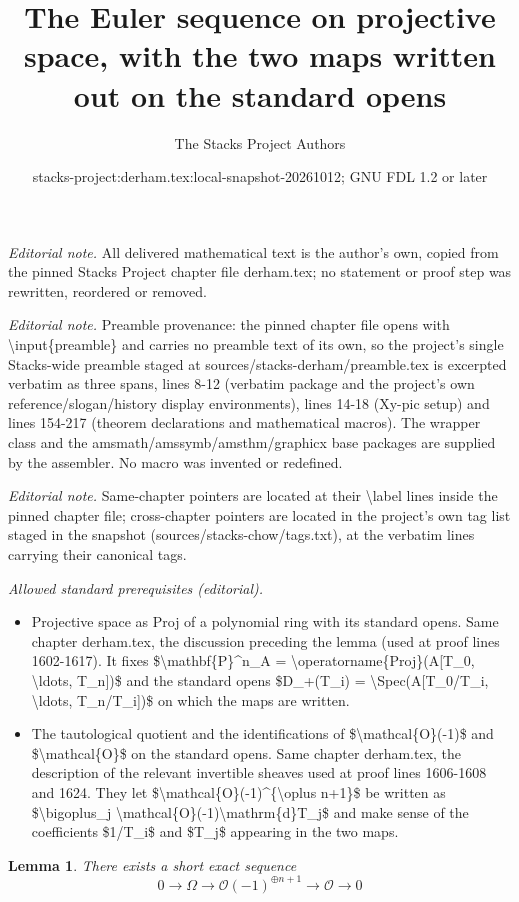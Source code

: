 \documentclass[10pt,a4paper]{amsart}
\title{The Euler sequence on projective space, with the two maps written out on the standard opens}
\author{The Stacks Project Authors}
\date{stacks-project:derham.tex:local-snapshot-20261012; GNU FDL 1.2 or later}
\theoremstyle{plain}
\newtheorem{lemma}[subsection]{Lemma}
\theoremstyle{definition}
\theoremstyle{remark}
\numberwithin{equation}{subsection}
\begin{document}
\maketitle
\noindent\textit{Editorial note.} All delivered mathematical text is the author's own, copied from the pinned Stacks Project chapter file derham.tex; no statement or proof step was rewritten, reordered or removed.\par\medskip
\noindent\textit{Editorial note.} Preamble provenance: the pinned chapter file opens with \textbackslash{}input\{preamble\} and carries no preamble text of its own, so the project's single Stacks-wide preamble staged at sources/stacks-derham/preamble.tex is excerpted verbatim as three spans, lines 8-12 (verbatim package and the project's own reference/slogan/history display environments), lines 14-18 (Xy-pic setup) and lines 154-217 (theorem declarations and mathematical macros). The wrapper class and the amsmath/amssymb/amsthm/graphicx base packages are supplied by the assembler. No macro was invented or redefined.\par\medskip
\noindent\textit{Editorial note.} Same-chapter pointers are located at their \textbackslash{}label lines inside the pinned chapter file; cross-chapter pointers are located in the project's own tag list staged in the snapshot (sources/stacks-chow/tags.txt), at the verbatim lines carrying their canonical tags.\par\medskip
\noindent\textit{Allowed standard prerequisites (editorial).}\begin{itemize}
\item Projective space as Proj of a polynomial ring with its standard opens. Same chapter derham.tex, the discussion preceding the lemma (used at proof lines 1602-1617). It fixes \$\textbackslash{}mathbf\{P\}\textasciicircum{}n\_A = \textbackslash{}operatorname\{Proj\}(A[T\_0, \textbackslash{}ldots, T\_n])\$ and the standard opens \$D\_+(T\_i) = \textbackslash{}Spec(A[T\_0/T\_i, \textbackslash{}ldots, T\_n/T\_i])\$ on which the maps are written.
\item The tautological quotient and the identifications of \$\textbackslash{}mathcal\{O\}(-1)\$ and \$\textbackslash{}mathcal\{O\}\$ on the standard opens. Same chapter derham.tex, the description of the relevant invertible sheaves used at proof lines 1606-1608 and 1624. They let \$\textbackslash{}mathcal\{O\}(-1)\textasciicircum{}\{\textbackslash{}oplus n+1\}\$ be written as \$\textbackslash{}bigoplus\_j \textbackslash{}mathcal\{O\}(-1)\textbackslash{}mathrm\{d\}T\_j\$ and make sense of the coefficients \$1/T\_i\$ and \$T\_j\$ appearing in the two maps.
\end{itemize}\medskip
\begin{lemma}
\label{lemma-euler-sequence}
There exists a short exact sequence
$$
0 \to \Omega \to \mathcal{O}(-1)^{\oplus n + 1} \to \mathcal{O} \to 0
$$
\end{lemma}
\end{document}
